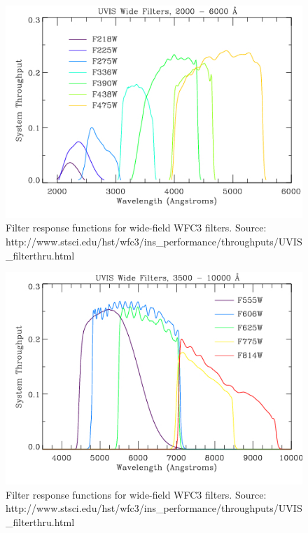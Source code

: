 \documentclass[12pt, a4paper]{report}
\begin{document}
\begin{figure}[h]
\begin{center}
\includegraphics[scale=0.5]{UVIS_Wide1.jpg}
\caption{Filter response functions for wide-field WFC3 filters. Source: http://www.stsci.edu/hst/wfc3/ins_performance/throughputs/UVIS_filterthru.html}
\label{WFC3_response_funcs1}
\end{center}
\end{figure}

\begin{figure}[h]
\begin{center}
\includegraphics[scale=0.5]{UVIS_Wide2.jpg}
\caption{Filter response functions for wide-field WFC3 filters. Source: http://www.stsci.edu/hst/wfc3/ins_performance/throughputs/UVIS_filterthru.html}
\label{WFC3_response_funcs2}
\end{center}
\end{figure}
\end{document}
